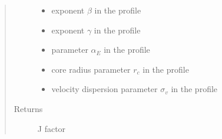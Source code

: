 \documentclass[letterpaper,10pt,english]{sphinxmanual}
\begin{document}
\begin{fulllineitems}
\begin{quote}
\begin{description}
\begin{itemize}
\item {} 
\sphinxAtStartPar
{} \textendash{} exponent \(\beta\) in the {\hyperref[\detokenize{diffsph.profiles:diffsph.profiles.templates.hdz}]{}} profile

\item {} 
\sphinxAtStartPar
{} \textendash{} exponent \(\gamma\) in the {\hyperref[\detokenize{diffsph.profiles:diffsph.profiles.templates.hdz}]{}} profile

\item {} 
\sphinxAtStartPar
{} \textendash{} parameter \(\alpha_E\) in the {\hyperref[\detokenize{diffsph.profiles:diffsph.profiles.templates.enst}]{}} profile

\item {} 
\sphinxAtStartPar
{} \textendash{} core radius parameter \(r_c\) in the {\hyperref[\detokenize{diffsph.profiles:diffsph.profiles.templates.cnfw}]{}} profile

\item {} 
\sphinxAtStartPar
{} \textendash{} velocity dispersion parameter \(\sigma_v\) in the {\hyperref[\detokenize{diffsph.profiles:diffsph.profiles.templates.sis}]{}} profile

\end{itemize}

\item[{Returns}] \leavevmode
\sphinxAtStartPar
J factor

\end{description}\end{quote}

\end{fulllineitems}

\end{document}
